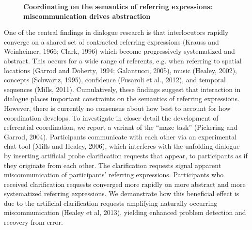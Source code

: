 \documentclass[10pt, a4paper, twopage, headinclude, footinclude, BCOR5mm]{scrartcl}
\begin{document}
\newpage

\begin{figure}[t!]
\centering
\large\textbf{Coordinating on the semantics of referring expressions: \\ miscommunication drives abstraction}
\vspace*{0.5cm}
\end{figure}


        \begin{table}[t!]
    \end{table}

\noindent
One of the central findings in dialogue research is that interlocutors rapidly converge on a shared set of contracted referring expressions (Krauss and Weinheimer, 1966; Clark, 1996) which become progressively systematized and abstract. This occurs for a wide range of referents, e.g. when referring to spatial locations (Garrod and Doherty, 1994; Galantucci, 2005), music (Healey, 2002), concepts (Schwartz, 1995), confidence (Fusaroli et al., 2012), and temporal sequences (Mills, 2011). Cumulatively, these findings suggest that interaction in dialogue places important constraints on the semantics of referring expressions. However, there is currently no consensus about how best to account for how coordination develops.    To investigate in closer detail the development of referential coordination, we report a variant of the “maze task” (Pickering and Garrod, 2004). Participants communicate with each other via an experimental chat tool (Mills and Healey, 2006), which interferes with the unfolding dialogue by inserting artificial probe clarification requests that appear, to participants as if they originate from each other. The clarification requests signal apparent miscommunication of participants’ referring expressions. Participants who received clarification requests converged more rapidly on more abstract and more systematized referring expressions. We demonstrate how this beneficial effect is due to the artificial clarification requests amplifying naturally occurring miscommunication (Healey et al, 2013),  yielding enhanced problem detection and recovery from error.
\end{document}
